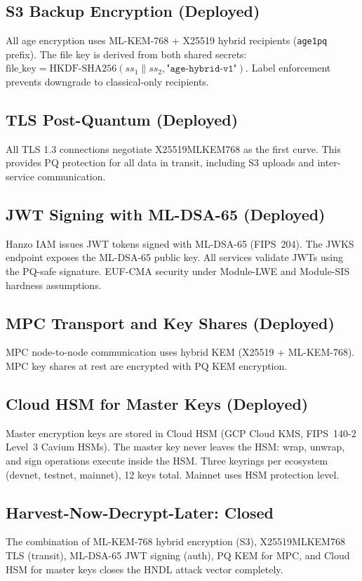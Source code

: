 \subsection{S3 Backup Encryption (Deployed)}

All age encryption uses ML-KEM-768 + X25519 hybrid recipients
(\texttt{age1pq} prefix). The file key is derived from both shared
secrets: $\text{file\_key} = \text{HKDF-SHA256}(ss_1 \| ss_2,
\texttt{"age-hybrid-v1"})$. Label enforcement prevents downgrade to
classical-only recipients.

\subsection{TLS Post-Quantum (Deployed)}

All TLS 1.3 connections negotiate X25519MLKEM768 as the first curve.
This provides PQ protection for all data in transit, including S3
uploads and inter-service communication.

\subsection{JWT Signing with ML-DSA-65 (Deployed)}

Hanzo IAM issues JWT tokens signed with ML-DSA-65 (FIPS~204). The
JWKS endpoint exposes the ML-DSA-65 public key. All services validate
JWTs using the PQ-safe signature. EUF-CMA security under Module-LWE
and Module-SIS hardness assumptions.

\subsection{MPC Transport and Key Shares (Deployed)}

MPC node-to-node communication uses hybrid KEM (X25519 + ML-KEM-768).
MPC key shares at rest are encrypted with PQ KEM encryption.

\subsection{Cloud HSM for Master Keys (Deployed)}

Master encryption keys are stored in Cloud HSM (GCP Cloud KMS,
FIPS~140-2 Level~3 Cavium HSMs). The master key never leaves the HSM:
wrap, unwrap, and sign operations execute inside the HSM. Three
keyrings per ecosystem (devnet, testnet, mainnet), 12 keys total.
Mainnet uses HSM protection level.

\subsection{Harvest-Now-Decrypt-Later: Closed}

The combination of ML-KEM-768 hybrid encryption (S3), X25519MLKEM768
TLS (transit), ML-DSA-65 JWT signing (auth), PQ KEM for MPC, and
Cloud HSM for master keys closes the HNDL attack vector completely.

